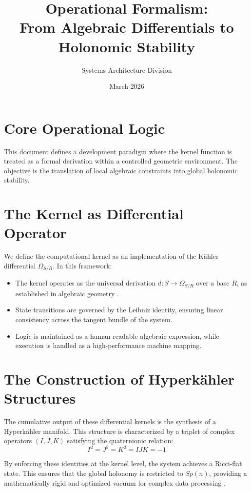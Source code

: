 \documentclass[10pt]{article}
\title{\textbf{Operational Formalism: \\ From Algebraic Differentials to Holonomic Stability}}
\author{Systems Architecture Division}
\date{March 2026}
\newcommand{\ka}{K\"{a}hler }
\newcommand{\hka}{Hyperk\"{a}hler }
\newcommand{\Omeg}{\Omega_{S/R}}
\begin{document}
\maketitle

\section{Core Operational Logic}
This document defines a development paradigm where the kernel function is treated as a formal derivation within a controlled geometric environment. The objective is the translation of local algebraic constraints into global holonomic stability.

\section{The Kernel as Differential Operator}
We define the computational kernel as an implementation of the \ka differential $\Omeg$. In this framework:
\begin{itemize}
    \item The kernel operates as the universal derivation $d: S \to \Omega_{S/R}$ over a base $R$, as established in algebraic geometry \cite{Grothendieck}.
    \item State transitions are governed by the Leibniz identity, ensuring linear consistency across the tangent bundle of the system.
    \item Logic is maintained as a human-readable algebraic expression, while execution is handled as a high-performance machine mapping.
\end{itemize}

\section{The Construction of \hka Structures}
The cumulative output of these differential kernels is the synthesis of a \hka manifold. This structure is characterized by a triplet of complex operators $(I, J, K)$ satisfying the quaternionic relation:
\[ I^2 = J^2 = K^2 = IJK = -1 \]

By enforcing these identities at the kernel level, the system achieves a Ricci-flat state. This ensures that the global holonomy is restricted to $Sp(n)$, providing a mathematically rigid and optimized vacuum for complex data processing \cite{Calabi} \cite{Yau}.
\end{document}

